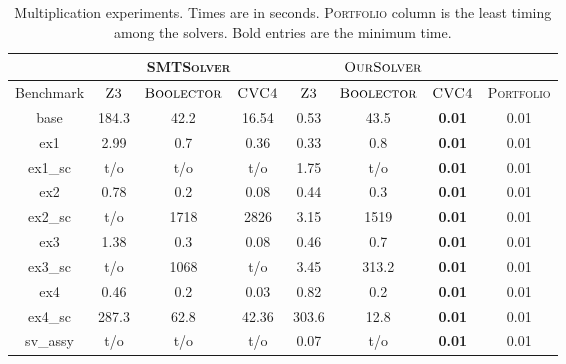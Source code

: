 \begin{table}[t]
\centering
\caption{Multiplication experiments. Times are in seconds.
\textsc{Portfolio} column is the least timing among the solvers. Bold entries are the minimum time.}
\label{tbl:time}
\begin{tabular}{|c|c|c|c|c|c|c|c|}
\hline
                      & \multicolumn{3}{c|}{\textsc{SMTSolver}}                    & \multicolumn{3}{c|}{$\textsc{OurSolver}$}  &                             \\ \hline
Benchmark             & $\textsc{Z3}$ & $\textsc{Boolector}$ & $\textsc{CVC4}$ & $\textsc{Z3}$ & $\textsc{Boolector}$ & $\textsc{CVC4}$ & \textsc{Portfolio} \\ \hline
base                  & 184.3    & 42.2         & 16.54        & 0.53      & 43.5         & \textbf{0.01}       & 0.01                 \\ \hline
ex1                   & 2.99      & 0.7          & 0.36                     & 0.33      & 0.8          & \textbf{0.01}       & 0.01                 \\ \hline
ex1\_sc         & t/o       & t/o          & t/o                         & 1.75      & t/o          & \textbf{0.01}       & 0.01                 \\ \hline
ex2                   & 0.78      & 0.2          & 0.08                     & 0.44      & 0.3          & \textbf{0.01}       & 0.01                 \\ \hline
ex2\_sc         & t/o       & 1718       & 2826               & 3.15      & 1519       & \textbf{0.01}       & 0.01                 \\ \hline
ex3                   & 1.38      & 0.3          & 0.08                      & 0.46      & 0.7          & \textbf{0.01}       & 0.01                 \\ \hline
ex3\_sc         & t/o       & 1068       & t/o                     & 3.45      & 313.2        & \textbf{0.01}       & 0.01                 \\ \hline
ex4         & 0.46      & 0.2          & 0.03                      & 0.82      & 0.2          & \textbf{0.01}       & 0.01                 \\ \hline
ex4\_sc     & 287.3    & 62.8         & 42.36                  & 303.6    & 12.8         & \textbf{0.01}       & 0.01                 \\ \hline
sv\_assy              & t/o       & t/o          & t/o                        & 0.07      & t/o          & \textbf{0.01}       & 0.01                 \\ \hline

\end{tabular}
\end{table}
